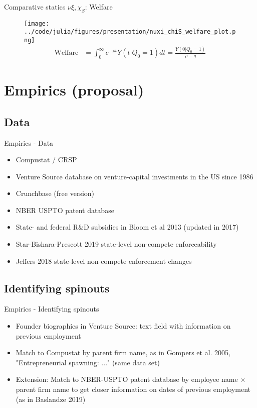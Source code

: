 \documentclass[english,usenames,dvipsnames]{beamer}
\begin{document}
\begin{frame}{Comparative statics $\nu \xi , \chi_S$: Welfare}
\begin{figure}
	\texttt{[image: ../code/julia/figures/presentation/nuxi\_chiS\_welfare\_plot.png]}
	\footnotesize
	\begin{align*}
	\textrm{Welfare} &= \int_0^{\infty} e^{-\rho t} Y(t|Q_0 = 1) dt = \frac{Y(0|Q_0 = 1)}{\rho - g}
	\end{align*}
\end{figure}
\end{frame}






\section{Empirics (proposal)}

\subsection{Data}

\begin{frame}{Empirics - Data}
\begin{itemize}
	\item Compustat / CRSP
	\item Venture Source database on venture-capital investments in the US since 1986
	\item Crunchbase (free version)
	\item NBER USPTO patent database
	\item State- and federal R\&D subsidies in Bloom et al 2013 (updated in 2017)
	\item Star-Bishara-Prescott 2019 state-level non-compete enforceability
	\item Jeffers 2018 state-level non-compete enforcement changes
\end{itemize}
\end{frame}

\subsection{Identifying spinouts}

\begin{frame}{Empirics - Identifying spinouts}
\begin{itemize}
	\item \alert{Founder biographies} in Venture Source: text field with information on \alert{previous employment}
	\item Match to Compustat by \alert{parent firm name}, as in Gompers et al. 2005, "Entrepreneurial spawning: ..." (same data set)
	\item Extension: Match to NBER-USPTO patent database by \alert{employee name $\times$ parent firm name} to get closer information on dates of previous employment (as in Baslandze 2019)
\end{itemize}
\end{frame}
\end{document}

